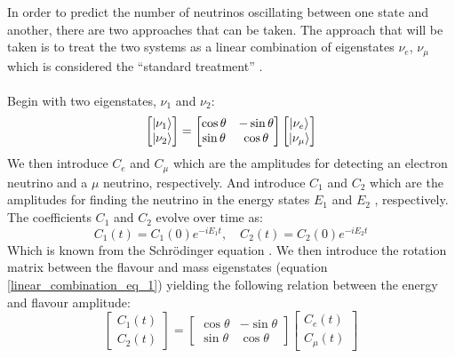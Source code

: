 In order to predict the number of neutrinos oscillating between one state and another, there are two approaches that can be taken. The approach that will be taken is to treat the two systems as a linear combination of eigenstates $\nu_e$, $\nu_\mu$ which is considered the ``standard treatment'' \cite{sassaroli1999neutrino}  \cite{griffiths2008neutrinoOscillations}.
\\\\Begin with two eigenstates, $\nu_1$ and $\nu_2$: 
\begin{equation}
    \begin{bmatrix}
        \ket{\nu_1} \\
        \ket{\nu_2}
    \end{bmatrix}
    =
    \begin{bmatrix}
        \cos\theta & -\sin\theta \\
        \sin\theta & \cos\theta 
    \end{bmatrix}
        \begin{bmatrix}
        \ket{\nu_e} \\
        \ket{\nu_\mu}
    \end{bmatrix}
    \label{linear_combination_eq_1}
\end{equation}
We then introduce $C_e$ and $C_\mu$ which are the amplitudes for detecting an electron neutrino and a $\mu$ neutrino, respectively. And introduce $C_1$ and $C_2$ which are the amplitudes for finding the neutrino in the energy states $E_1$ and $E_2$ , respectively. The coefficients $C_1$ and $C_2$ evolve over time as:
\begin{equation}
    C_1(t) = C_1(0)e^{-iE_1t}, \quad  C_2(t) = C_2(0)e^{-iE_2t}
    \label{linear_combination_eq_1.5}
\end{equation}
Which is known from the Schrödinger equation \cite{sassaroli1999neutrino} \cite{griffiths2008neutrinoOscillations}. We then introduce the rotation matrix between the flavour and mass eigenstates (equation \ref{linear_combination_eq_1}) yielding the following relation between the energy and flavour amplitude:
\begin{equation}
    \begin{bmatrix}
        C_1(t) \\
        C_2(t)
    \end{bmatrix}
    =
    \begin{bmatrix}
        \cos\theta & -\sin\theta \\
        \sin\theta & \cos\theta 
    \end{bmatrix}
        \begin{bmatrix}
        C_e(t) \\
        C_\mu(t)
    \end{bmatrix}
    \label{linear_combination_eq_2}
\end{equation}
